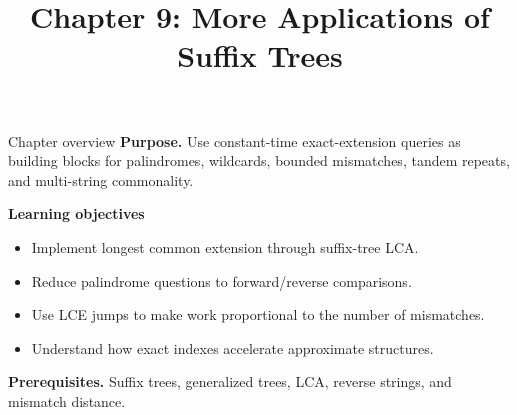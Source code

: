 \documentclass[11pt,letterpaper]{article}
\title{Chapter 9: More Applications of Suffix Trees}
\author{}
\date{}
\begin{document}
\maketitle

\begin{CornellOverviewBox}{Chapter overview}
\textbf{Purpose.} Use constant-time exact-extension queries as building blocks for palindromes, wildcards, bounded mismatches, tandem repeats, and multi-string commonality.

\textbf{Learning objectives}
\begin{itemize}
  \item Implement longest common extension through suffix-tree LCA.
  \item Reduce palindrome questions to forward/reverse comparisons.
  \item Use LCE jumps to make work proportional to the number of mismatches.
  \item Understand how exact indexes accelerate approximate structures.
\end{itemize}

\textbf{Prerequisites.} Suffix trees, generalized trees, LCA, reverse strings, and mismatch distance.
\end{CornellOverviewBox}
\end{document}
